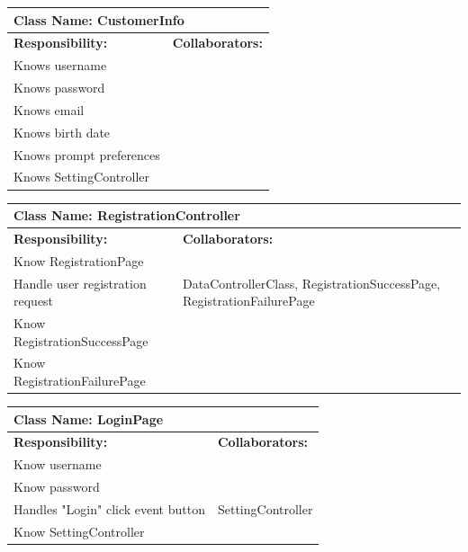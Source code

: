 \documentclass[]{article}
\begin{document}
	\begin{table}[H]
	\centering
	\begin{tabular}{|p{6cm}|p{6cm}|}
	\hline 
		\multicolumn{2}{|l|}{\textbf{Class Name: CustomerInfo}} \\
	\hline
	\textbf{Responsibility:} & \textbf{Collaborators:} \\
	\hline 
	Knows username&\\ \hline
	Knows password&\\ \hline 
	Knows email&\\ \hline 
	Knows birth date&\\ \hline 
	Knows prompt preferences &\\ \hline
	Knows SettingController &\\ \hline
	\end{tabular}
	\end{table}
	
	\begin{table}[H]
	\centering
	\begin{tabular}{|p{6cm}|p{6cm}|}
	\hline 
		\multicolumn{2}{|l|}{\textbf{Class Name: RegistrationController}} \\
	\hline
	\textbf{Responsibility:} & \textbf{Collaborators:} \\
	\hline
	Know RegistrationPage&\\ \hline
	Handle user registration request & DataControllerClass, RegistrationSuccessPage, RegistrationFailurePage\\ \hline
	Know RegistrationSuccessPage &\\ \hline
	Know RegistrationFailurePage &\\ \hline
	\end{tabular}
	\end{table}
	
	\begin{table}[H]
	\centering
	\begin{tabular}{|p{6cm}|p{6cm}|}
	\hline 
		\multicolumn{2}{|l|}{\textbf{Class Name: LoginPage}} \\
	\hline
	\textbf{Responsibility:} & \textbf{Collaborators:} \\
	\hline
	Know username & \\ \hline
	Know password & \\ \hline
	Handles "Login" click event button & SettingController\\ \hline
	Know SettingController &\\ \hline
	\end{tabular}
	\end{table}
	
\end{document}
